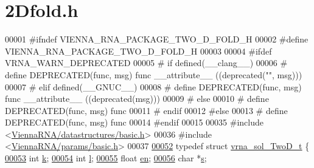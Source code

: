 \hypertarget{2Dfold_8h_source}{}\section{2\+Dfold.h}
\label{2Dfold_8h_source}

\begin{DoxyCode}
00001 \textcolor{preprocessor}{#ifndef VIENNA\_RNA\_PACKAGE\_TWO\_D\_FOLD\_H}
00002 \textcolor{preprocessor}{#define VIENNA\_RNA\_PACKAGE\_TWO\_D\_FOLD\_H}
00003 
00004 \textcolor{preprocessor}{#ifdef VRNA\_WARN\_DEPRECATED}
00005 \textcolor{preprocessor}{# if defined(\_\_clang\_\_)}
00006 \textcolor{preprocessor}{#  define DEPRECATED(func, msg) func \_\_attribute\_\_ ((deprecated("", msg)))}
00007 \textcolor{preprocessor}{# elif defined(\_\_GNUC\_\_)}
00008 \textcolor{preprocessor}{#  define DEPRECATED(func, msg) func \_\_attribute\_\_ ((deprecated(msg)))}
00009 \textcolor{preprocessor}{# else}
00010 \textcolor{preprocessor}{#  define DEPRECATED(func, msg) func}
00011 \textcolor{preprocessor}{# endif}
00012 \textcolor{preprocessor}{#else}
00013 \textcolor{preprocessor}{# define DEPRECATED(func, msg) func}
00014 \textcolor{preprocessor}{#endif}
00015 
00035 \textcolor{preprocessor}{#include <\hyperlink{datastructures_2basic_8h}{ViennaRNA/datastructures/basic.h}>}
00036 \textcolor{preprocessor}{#include <\hyperlink{params_2basic_8h}{ViennaRNA/params/basic.h}>}
00037 
\hyperlink{group__kl__neighborhood__mfe}{00052} \textcolor{keyword}{typedef} \textcolor{keyword}{struct }\hyperlink{group__kl__neighborhood__mfe_structvrna__sol__TwoD__t}{vrna\_sol\_TwoD\_t} \{
\hyperlink{group__kl__neighborhood__mfe_ac111e850bb3b3a11b6b5707912cfa1b8}{00053}   \textcolor{keywordtype}{int}   \hyperlink{group__kl__neighborhood__mfe_ac111e850bb3b3a11b6b5707912cfa1b8}{k};        
\hyperlink{group__kl__neighborhood__mfe_ab8e95cd920901175a2cc8de726ab1d36}{00054}   \textcolor{keywordtype}{int}   \hyperlink{group__kl__neighborhood__mfe_ab8e95cd920901175a2cc8de726ab1d36}{l};        
\hyperlink{group__kl__neighborhood__mfe_a7577863a6a84224dfee39b321c03cab1}{00055}   \textcolor{keywordtype}{float} \hyperlink{group__kl__neighborhood__mfe_a7577863a6a84224dfee39b321c03cab1}{en};       
\hyperlink{group__kl__neighborhood__mfe_ac5942d2505a6cd7e4a8073a321d5d2d5}{00056}   \textcolor{keywordtype}{char}  *\hyperlink{group__kl__neighborhood__mfe_ac5942d2505a6cd7e4a8073a321d5d2d5}{s};       

\end{DoxyCode}
